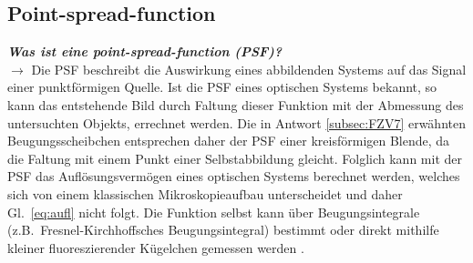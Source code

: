 \subsection{\label{subsec:FZV8}Point-spread-function}
\textbf{\textit{Was ist eine point-spread-function (PSF)?}} \\
$\rightarrow$
Die PSF beschreibt die Auswirkung eines abbildenden Systems auf das Signal einer 
punktförmigen Quelle. Ist die PSF eines optischen Systems bekannt, so kann das 
entstehende Bild durch Faltung dieser Funktion mit der Abmessung des untersuchten 
Objekts, errechnet werden. Die in Antwort \ref{subsec:FZV7} erwähnten Beugungsscheibchen
entsprechen daher der PSF einer kreisförmigen Blende, da die Faltung mit einem Punkt einer 
Selbstabbildung gleicht. Folglich kann mit der PSF das Auflösungsvermögen eines optischen Systems 
berechnet werden, welches sich von einem klassischen Mikroskopieaufbau unterscheidet und 
daher Gl.~\eqref{eq:aufl} nicht folgt. 
Die Funktion selbst kann über Beugungsintegrale (z.B.~Fresnel-Kirchhoffsches Beugungsintegral)
bestimmt oder direkt mithilfe kleiner fluoreszierender Kügelchen gemessen werden \cite{Auf1, Auf2, Auf3}. \\ 
